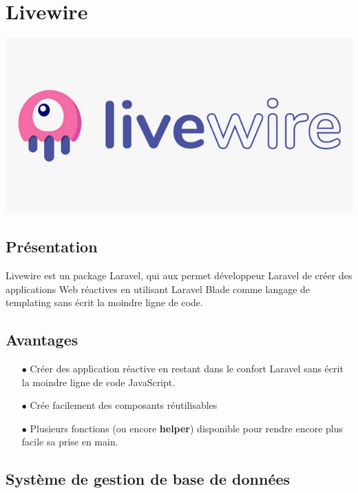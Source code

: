 			\section*{Livewire}
				\begin{center}
					\includegraphics[scale=0.6]{chap_2/livewire.png}
					\label{logo de livewire}
					\cite{logo_livewire}
				\end{center}
				\subsection*{Présentation}
					Livewire est un package Laravel, qui aux permet développeur Laravel de créer des applications Web réactives en utilisant Laravel Blade comme langage de templating sans écrit la moindre ligne de code.
					
				\subsection*{Avantages}
				\begin{itemize}
					\item[$\bullet$] Créer des application réactive en restant dans le confort Laravel sans écrit la moindre ligne de code JavaScript.
					\item[$\bullet$] Crée facilement des composants réutilisables
					\item[$\bullet$] Plusieurs fonctions (ou encore \textbf{helper}) disponible pour rendre encore plus facile sa prise en main.
				\end{itemize}
			
			
		\subsection{Système de gestion de base de données}
		\newpage
